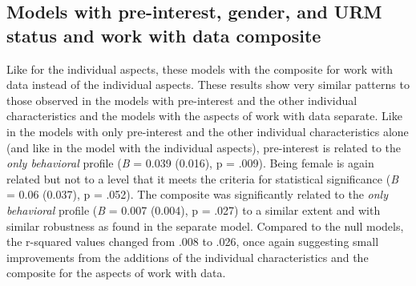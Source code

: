 \documentclass[]{book}
\theoremstyle{definition}
\theoremstyle{definition}
\theoremstyle{definition}
\theoremstyle{remark}
\begin{document}
\subsection{Models with pre-interest, gender, and URM status and work
with data
composite}\label{models-with-pre-interest-gender-and-urm-status-and-work-with-data-composite}

Like for the individual aspects, these models with the composite for
work with data instead of the individual aspects. These results show
very similar patterns to those observed in the models with pre-interest
and the other individual characteristics and the models with the aspects
of work with data separate. Like in the models with only pre-interest
and the other individual characteristics alone (and like in the model
with the individual aspects), pre-interest is related to the \emph{only
behavioral} profile (\emph{B} = 0.039 (0.016), p = .009). Being female
is again related but not to a level that it meets the criteria for
statistical significance (\emph{B} = 0.06 (0.037), p = .052). The
composite was significantly related to the \emph{only behavioral}
profile (\emph{B} = 0.007 (0.004), p = .027) to a similar extent and
with similar robustness as found in the separate model. Compared to the
null models, the r-squared values changed from .008 to .026, once again
suggesting small improvements from the additions of the individual
characteristics and the composite for the aspects of work with data.
\end{document}
